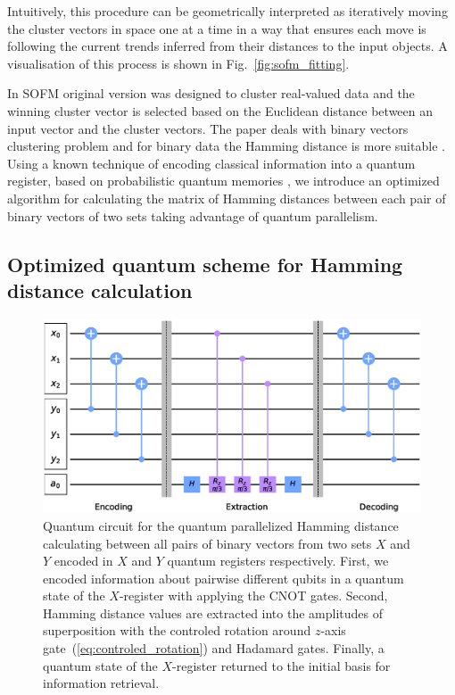 \documentclass[pra,showkeys,twocolumn,showpacs]{revtex4-1}
\begin{document}
Intuitively, this procedure can be geometrically interpreted as iteratively moving the cluster vectors in space one at a time in a way 
that ensures each move is following the current trends inferred from their distances to the input objects. 
A visualisation of this process is shown in Fig.~\ref{fig:sofm_fitting}.

In SOFM original version was designed to cluster real-valued data
and the winning cluster vector is selected based on the Euclidean distance between an input vector and the cluster vectors.
The paper deals with binary vectors clustering problem 
and for binary data the Hamming distance is more suitable \cite{appiah2009, santana2017}.
Using a known technique of encoding classical information into a quantum register, 
based on probabilistic quantum memories \cite{trugenberger2001},
we introduce an optimized algorithm for calculating the matrix of Hamming distances 
between each pair of binary vectors  of two sets taking advantage of quantum parallelism.













\subsection{Optimized quantum scheme for Hamming distance calculation}
\label{subsec:qcircuit}


\begin{figure}[t]
	\includegraphics[width=\columnwidth]{qcircuit.eps}
	\caption{
		Quantum circuit for the quantum parallelized Hamming distance calculating  between all pairs of binary vectors from two sets ${X}$ and ${Y}$ encoded \cite{trugenberger2001} in $X$ and $Y$ quantum registers   respectively.
		First, we encoded information about pairwise different qubits in a quantum state of the $X$-register with applying the CNOT gates. 
		Second, Hamming distance values are extracted into the amplitudes of superposition with the controled rotation around $z$-axis gate~(\ref{eq:controled_rotation}) and Hadamard gates. 
		Finally, a quantum state of the $X$-register returned to the initial basis for information retrieval. 	
	} 
	\label{fig:qcircuit}
\end{figure}
\end{document}
